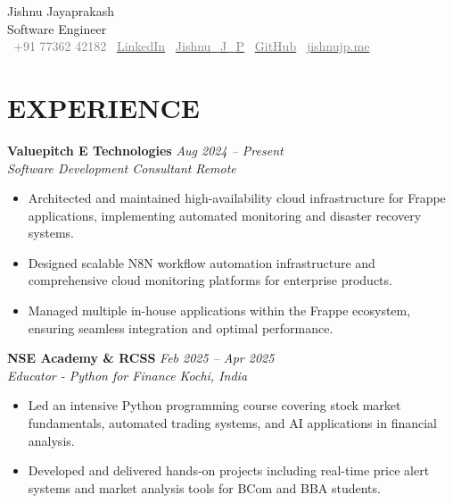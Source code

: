 \documentclass[11pt,a4paper]{article}
\begin{document}
\begin{center}
    {\LARGE Jishnu Jayaprakash} \\
    Software Engineer \\
    \faWhatsapp~\textcolor{gray}{+91 77362 42182} \quad
    \faLinkedinSquare~\href{https://www.linkedin.com/in/jishnu-jayaprakash-813488156}{\textcolor{gray}{LinkedIn}} \quad
    \faTwitter~\href{https://x.com/Jishnu_J_P}{\textcolor{gray}{Jishnu\_J\_P}} \quad
    \faGithub~\href{https://github.com/jishnujp}{\textcolor{gray}{GitHub}} \quad
    \faGlobe~\href{https://jishnujp.me}{\textcolor{gray}{jishnujp.me}} \quad

\end{center}

\vspace{0.5em}

\section*{EXPERIENCE}

\textbf{Valuepitch E Technologies} \hfill \textit{Aug 2024 -- Present} \\
\textit{Software Development Consultant} \hfill \textit{Remote} \begin{itemize}[leftmargin=*]
    \item Architected and maintained high-availability cloud infrastructure for Frappe applications, implementing automated monitoring and disaster recovery systems.
    \item Designed scalable N8N workflow automation infrastructure and comprehensive cloud monitoring platforms for enterprise products.
    \item Managed multiple in-house applications within the Frappe ecosystem, ensuring seamless integration and optimal performance.
\end{itemize}


\textbf{NSE Academy \& RCSS} \hfill \textit{Feb 2025 -- Apr 2025} \\
\textit{Educator - Python for Finance} \hfill \textit{Kochi, India} \begin{itemize}[leftmargin=*]
    \item Led an intensive Python programming course covering stock market fundamentals, automated trading systems, and AI applications in financial analysis.
    \item Developed and delivered hands-on projects including real-time price alert systems and market analysis tools for BCom and BBA students.
\end{itemize}
\end{document}
